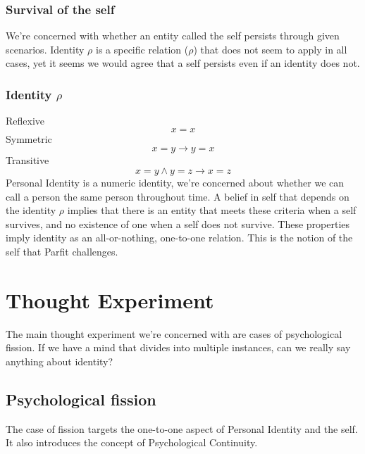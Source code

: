 \documentclass[11pt]{article}
\begin{document}
\subsubsection*{Survival of the self}
\label{sec:org167bce4}
We're concerned with whether an entity called the self persists through given scenarios.
Identity \(\rho\) is a specific relation (\(\rho\)) that does not seem to apply in all cases,
yet it seems we would agree that a self persists even if an identity does not.

\subsubsection*{Identity \(\rho\)}
\label{sec:org9f25fe0}
Reflexive \[x=x\]
Symmetric \[x=y \rightarrow y=x\]
Transitive \[x=y \wedge y=z \rightarrow x=z\]
Personal Identity is a numeric identity, we're concerned about whether we can call a person the same person throughout time.
A belief in self that depends on the identity \(\rho\) implies that there is an entity that meets these criteria when a self survives, and no existence of one when a self does not survive.
These properties imply identity as an all-or-nothing, one-to-one relation.
This is the notion of the self that Parfit challenges.

\section*{Thought Experiment}
\label{sec:orgce83243}
The main thought experiment we're concerned with are cases of psychological fission.
If we have a mind that divides into multiple instances, can we really say anything about identity?


\subsection*{Psychological fission}
\label{sec:org6f4e3b1}
The case of fission targets the one-to-one aspect of Personal Identity and the self.
It also introduces the concept of Psychological Continuity.
\\\empty
\\\empty
{}
\end{document}
